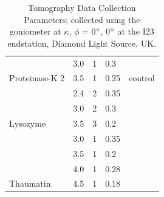 \begin{table}[h]
{\begin{tabular}{@{}lllll@{}}
                                 & 3.0    & 1             & 0.3                           &                                \\
\multirow{-2}{*}{Proteinase-K 2} & 3.5    & 1             & 0.25                          & \multirow{-2}{*}{control}      \\
                                 & 2.4    & 2             & 0.35                          &                                \\
                                 & 3.0    & 2             & 0.3                           &                                \\
\multirow{-3}{*}{Lysozyme}       & 3.5    & 3             & 0.2                           &                                \\
                                 & 3.0    & 1             & 0.35                          &                                \\
                                 & 3.5    & 1             & 0.2                           &                                \\
                                 & 4.0    & 1             & 0.28                          &                                \\
\multirow{-4}{*}{Thaumatin}      & 4.5    & 1             & 0.18                          &       \\
\bottomrule
\end{tabular}%
}

\caption{Tomography Data Collection Parameters; collected using the goniometer at $\kappa$, $\phi$ = 0$\degree$, 0$\degree$ at the I23 endstation, Diamond Light Source, UK.}
\label{tomo_table}
\end{table}




